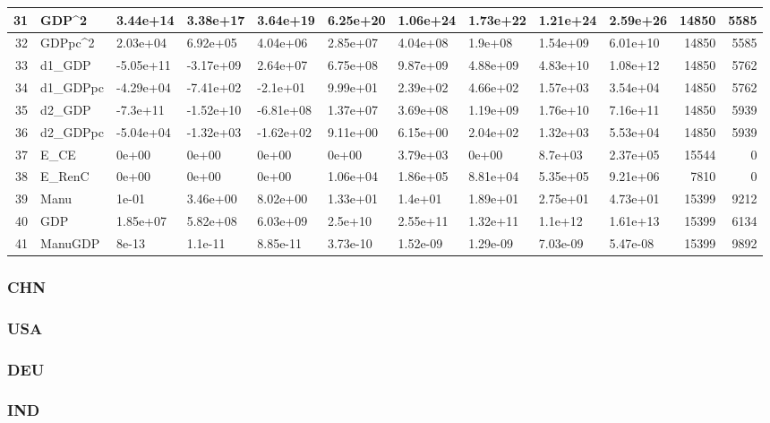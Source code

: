 \documentclass{article}\usepackage[]{graphicx}\usepackage[]{color}
\begin{document}
\begin{landscape}
\begin{longtable}[t]{r|l|l|l|l|l|l|l|l|l|r|r}
\hline
31 & GDP\textasciicircum{}2 & 3.44e+14 & 3.38e+17 & 3.64e+19 & 6.25e+20 & 1.06e+24 & 1.73e+22 & 1.21e+24 & 2.59e+26 & 14850 & 5585\\
\hline
32 & GDPpc\textasciicircum{}2 & 2.03e+04 & 6.92e+05 & 4.04e+06 & 2.85e+07 & 4.04e+08 & 1.9e+08 & 1.54e+09 & 6.01e+10 & 14850 & 5585\\
\hline
33 & d1\_GDP & -5.05e+11 & -3.17e+09 & 2.64e+07 & 6.75e+08 & 9.87e+09 & 4.88e+09 & 4.83e+10 & 1.08e+12 & 14850 & 5762\\
\hline
34 & d1\_GDPpc & -4.29e+04 & -7.41e+02 & -2.1e+01 & 9.99e+01 & 2.39e+02 & 4.66e+02 & 1.57e+03 & 3.54e+04 & 14850 & 5762\\
\hline
35 & d2\_GDP & -7.3e+11 & -1.52e+10 & -6.81e+08 & 1.37e+07 & 3.69e+08 & 1.19e+09 & 1.76e+10 & 7.16e+11 & 14850 & 5939\\
\hline
36 & d2\_GDPpc & -5.04e+04 & -1.32e+03 & -1.62e+02 & 9.11e+00 & 6.15e+00 & 2.04e+02 & 1.32e+03 & 5.53e+04 & 14850 & 5939\\
\hline
37 & E\_CE & 0e+00 & 0e+00 & 0e+00 & 0e+00 & 3.79e+03 & 0e+00 & 8.7e+03 & 2.37e+05 & 15544 & 0\\
\hline
38 & E\_RenC & 0e+00 & 0e+00 & 0e+00 & 1.06e+04 & 1.86e+05 & 8.81e+04 & 5.35e+05 & 9.21e+06 & 7810 & 0\\
\hline
39 & Manu & 1e-01 & 3.46e+00 & 8.02e+00 & 1.33e+01 & 1.4e+01 & 1.89e+01 & 2.75e+01 & 4.73e+01 & 15399 & 9212\\
\hline
40 & GDP & 1.85e+07 & 5.82e+08 & 6.03e+09 & 2.5e+10 & 2.55e+11 & 1.32e+11 & 1.1e+12 & 1.61e+13 & 15399 & 6134\\
\hline
41 & ManuGDP & 8e-13 & 1.1e-11 & 8.85e-11 & 3.73e-10 & 1.52e-09 & 1.29e-09 & 7.03e-09 & 5.47e-08 & 15399 & 9892\\
\hline
\end{longtable}


\end{landscape}

\subsubsection{CHN}
\subsubsection{USA}
\subsubsection{DEU}
\subsubsection{IND}
\end{document}
